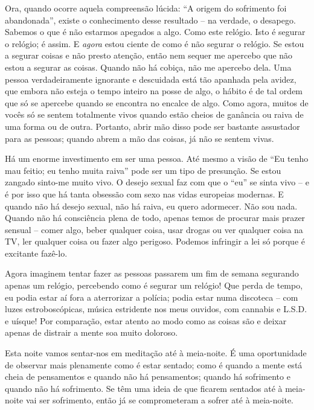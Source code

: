 Ora, quando ocorre aquela compreensão lúcida: ``A origem do sofrimento foi
abandonada'', existe o conhecimento desse resultado -- na verdade, o desapego.
Sabemos o que é não estarmos apegados a algo. Como este relógio. Isto é segurar
o relógio; é assim. E \emph{agora} estou ciente de como é não segurar o relógio.
Se estou a segurar coisas e não presto atenção, então nem sequer me apercebo que
não estou a segurar as coisas. Quando não há cobiça, não me apercebo dela. Uma
pessoa verdadeiramente ignorante e descuidada está tão apanhada pela avidez, que
embora não esteja o tempo inteiro na posse de algo, o hábito é de tal ordem que
só se apercebe quando se encontra no encalce de algo. Como agora, muitos de
vocês só se sentem totalmente vivos quando estão cheios de ganância ou raiva de
uma forma ou de outra. Portanto, abrir mão disso pode ser bastante assustador
para as pessoas; quando abrem a mão das coisas, já não se sentem vivas.

Há um enorme investimento em ser uma pessoa. Até mesmo a visão de ``Eu tenho mau
feitio; eu tenho muita raiva'' pode ser um tipo de presunção. Se estou zangado
sinto-me muito vivo. O desejo sexual faz com que o ``eu'' se sinta vivo -- e é
por isso que há tanta obsessão com sexo nas vidas europeias modernas. E quando
não há desejo sexual, não há raiva, eu quero adormecer. Não sou nada. Quando não
há consciência plena de todo, apenas temos de procurar mais prazer sensual --
comer algo, beber qualquer coisa, usar drogas ou ver qualquer coisa na TV, ler
qualquer coisa ou fazer algo perigoso. Podemos infringir a lei só porque é
excitante fazê-lo.

Agora imaginem tentar fazer as pessoas passarem um fim de semana segurando
apenas um relógio, percebendo como é segurar um relógio! Que perda de tempo, eu
podia estar aí fora a aterrorizar a polícia; podia estar numa discoteca -- com
luzes estroboscópicas, música estridente nos meus ouvidos, com cannabis e L.S.D.
e uísque! Por comparação, estar atento ao modo como as coisas são e deixar
apenas de distrair a mente soa muito doloroso.

Esta noite vamos sentar-nos em meditação até à meia-noite. É uma oportunidade de
observar mais plenamente como é estar sentado; como é quando a mente está cheia
de pensamentos e quando não há pensamentos; quando há sofrimento e quando não há
sofrimento. Se têm uma ideia de que ficarem sentados até à meia-noite vai ser
sofrimento, então já se comprometeram a sofrer até à meia-noite.

